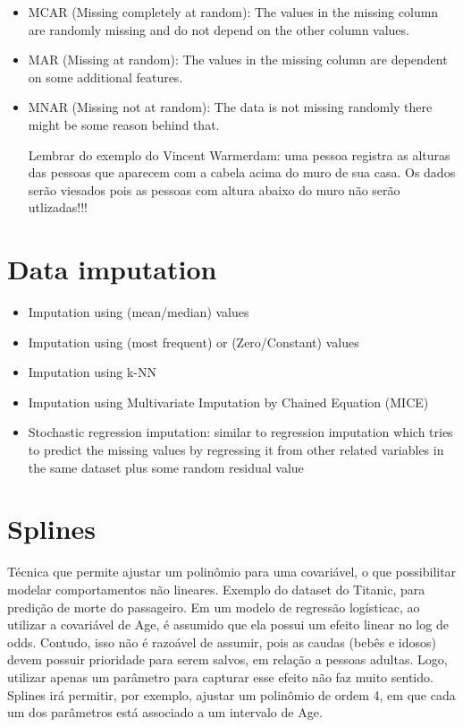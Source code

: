 \begin{itemize}
    \item MCAR (Missing completely at random): The values in the missing column are randomly missing and do not depend on the other column values.
    \item MAR (Missing at random): The values in the missing column are dependent on some additional features.
    \item MNAR (Missing not at random): The data is not missing randomly there might be some reason behind that.
    
    Lembrar do exemplo do Vincent Warmerdam: uma pessoa registra as alturas das pessoas que aparecem com a cabela acima do muro de sua casa. Os dados serão viesados pois as pessoas com altura abaixo do muro não serão utlizadas!!!
\end{itemize}

\section{Data imputation}

\begin{itemize}
    \item Imputation using (mean/median) values
    \item Imputation using (most frequent) or (Zero/Constant) values
    \item Imputation using k-NN
    \item Imputation using Multivariate Imputation by Chained Equation (MICE)
    \item Stochastic regression imputation: similar to regression imputation which tries to predict the missing values by regressing it from other related variables in the same dataset plus some random residual value
\end{itemize}

\section{Splines}
Técnica que permite ajustar um polinômio para uma covariável, o que possibilitar modelar comportamentos não lineares. Exemplo do dataset do Titanic, para predição de morte do passageiro. Em um modelo de regressão logísticac, ao utilizar a covariável de Age, é assumido que ela possui um efeito linear no log de odds. Contudo, isso não é razoável de assumir, pois as caudas (bebês e idosos) devem possuir prioridade para serem salvos, em relação a pessoas adultas. Logo, utilizar apenas um parâmetro para capturar esse efeito não faz muito sentido. Splines irá permitir, por exemplo, ajustar um polinômio de ordem 4, em que cada um dos parâmetros está associado a um intervalo de Age. 


